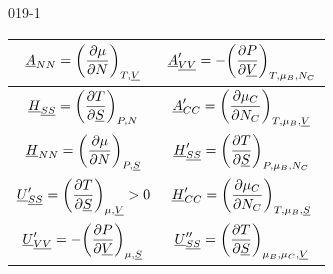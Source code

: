 \begin{mitframe}{019-1}
\begin{longtable}{ | c | c | }
    $ \uline{\helmholtz}_{\nummoles\nummoles} = \bigg(\dfrac{\partial\chempot}{\partial\nummoles}\bigg)_{\Temp,\uline{\vol}}$ & $ \uline{\helmholtz}_{\uline{\vol} \uline{\vol}}^{\prime} = -\bigg(\dfrac{\partial\p}{\partial\uline{\vol}}\bigg)_{\Temp,\chempot_{\exergy},\nummoles_{\conc}}$ \\ \hline 
    
    $\uline{\enthalpy}_{\uline{\entropy} \uline{\entropy}} = \bigg(\dfrac{\partial\Temp}{\partial\uline{\entropy}}\bigg)_{\p,\nummoles}$ & $\uline{\helmholtz}_{\conc\conc}^{\prime} = \bigg(\dfrac{\partial\chempot_{\conc}}{\partial\nummoles_{\conc}}\bigg)_{\Temp,\chempot_{\exergy},\uline{\vol}}$ \\ \hline
    
    $\uline{\enthalpy}_{\nummoles\nummoles} = \bigg(\dfrac{\partial\chempot}{\partial\nummoles}\bigg)_{\p,\uline{\entropy}}$ & $\uline{\enthalpy}_{\uline{\entropy} \uline{\entropy}}^{\prime} = \bigg(\dfrac{\partial\Temp}{\partial\uline{\entropy}}\bigg)_{\p,\chempot_{\exergy},\nummoles_{\conc}}$\\ \hline   
    
    $\uline{\intenergy}_{\uline{\entropy} \uline{\entropy}}^{\prime} =\bigg(\dfrac{\partial\Temp}{\partial\uline{\entropy}}\bigg)_{\chempot,\uline{\vol}} > 0$ & $\uline{\enthalpy}_{\conc\conc}^{\prime} = \bigg(\dfrac{\partial\chempot_{\conc}}{\partial\nummoles_{\conc}}\bigg)_{\Temp,\chempot_{\exergy},\uline{\entropy}}$  \\ \hline   
    
    $\uline{\intenergy}_{\uline{\vol} \uline{\vol}}^{\prime} = -\bigg(\dfrac{\partial\p}{\partial\uline{\vol}}\bigg)_{\chempot,\uline{\entropy}}$ & $\uline{\intenergy}_{\uline{\entropy} \uline{\entropy}}^{\prime\prime} = \bigg(\dfrac{\partial\Temp}{\partial\uline{\entropy}}\bigg)_{\chempot_{\exergy},\chempot_{\conc},\uline{\vol}}$ \\ \hline   
    

\end{longtable}
\end{mitframe}
